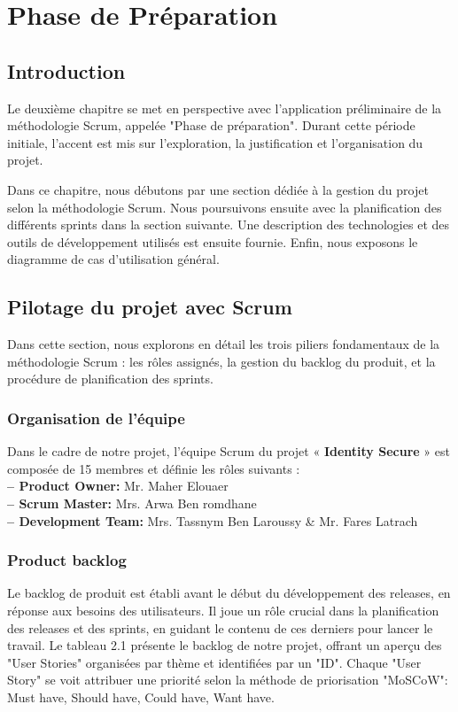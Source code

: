 \chapter{Phase de Préparation}
\section*{Introduction}
Le deuxième chapitre se met en perspective avec l'application préliminaire de la méthodologie Scrum, appelée "Phase de préparation". Durant cette période initiale, l'accent est mis sur l'exploration, la justification et l'organisation du projet.

Dans ce chapitre, nous débutons par une section dédiée à la gestion du projet selon la méthodologie Scrum. Nous poursuivons ensuite avec la planification des différents sprints dans la section suivante. Une description des technologies et des outils de développement utilisés est ensuite fournie. Enfin, nous exposons le diagramme de cas d'utilisation général.

\section{Pilotage du projet avec Scrum}
Dans cette section, nous explorons en détail les trois piliers fondamentaux de la méthodologie Scrum : les rôles assignés, la gestion du backlog du produit, et la procédure de planification des sprints.
\subsection{Organisation de l'équipe}
Dans le cadre de notre projet, l'équipe Scrum du projet « \textbf{Identity Secure} » est composée de
15 membres et définie les rôles suivants :\\
\textbf{– Product Owner:} Mr. Maher Elouaer\\
\textbf{– Scrum Master:} Mrs. Arwa Ben romdhane\\
\textbf{– Development Team:} Mrs. Tassnym Ben Laroussy \& Mr. Fares Latrach\\
\subsection{Product backlog}
Le backlog de produit est établi avant le début du développement des releases, en réponse aux besoins des utilisateurs. Il joue un rôle crucial dans la planification des releases et des sprints, en guidant le contenu de ces derniers pour lancer le travail. Le tableau 2.1 présente le backlog de notre projet, offrant un aperçu des "User Stories" organisées par thème et identifiées par un "ID". Chaque "User Story" se voit attribuer une priorité selon la méthode de priorisation "MoSCoW": Must have, Should have, Could have, Want have.

